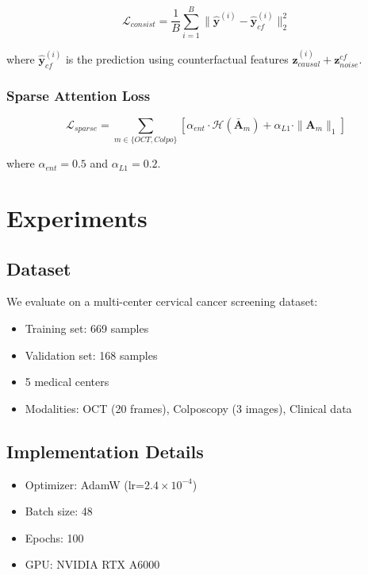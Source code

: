 \documentclass[11pt]{article}
\begin{document}
\begin{equation}
\mathcal{L}_{consist} = \frac{1}{B}\sum_{i=1}^{B} \|\hat{\mathbf{y}}^{(i)} - \hat{\mathbf{y}}_{cf}^{(i)}\|_2^2
\end{equation}

where $\hat{\mathbf{y}}_{cf}^{(i)}$ is the prediction using counterfactual features $\mathbf{z}_{causal}^{(i)} + \mathbf{z}_{noise}^{cf}$.

\subsubsection{Sparse Attention Loss}

\begin{equation}
\mathcal{L}_{sparse} = \sum_{m \in \{OCT, Colpo\}} \left[\alpha_{ent} \cdot \mathcal{H}(\bar{\mathbf{A}}_m) + \alpha_{L1} \cdot \|\mathbf{A}_m\|_1\right]
\end{equation}

where $\alpha_{ent} = 0.5$ and $\alpha_{L1} = 0.2$.


\section{Experiments}

\subsection{Dataset}

We evaluate on a multi-center cervical cancer screening dataset:
\begin{itemize}
\item Training set: 669 samples
\item Validation set: 168 samples
\item 5 medical centers
\item Modalities: OCT (20 frames), Colposcopy (3 images), Clinical data
\end{itemize}

\subsection{Implementation Details}

\begin{itemize}
\item Optimizer: AdamW (lr=$2.4 \times 10^{-4}$)
\item Batch size: 48
\item Epochs: 100
\item GPU: NVIDIA RTX A6000
\end{itemize}
\end{document}
